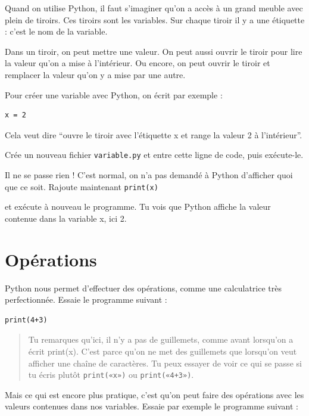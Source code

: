 \documentclass[a4paper,french,11pt]{article}
\begin{document}
Quand on utilise Python, il faut s'imaginer qu'on a accès à un grand
meuble avec plein de tiroirs. Ces tiroirs sont les variables. Sur chaque
tiroir il y a une étiquette : c'est le nom de la variable.

Dans un tiroir, on peut mettre une valeur. On peut aussi ouvrir le
tiroir pour lire la valeur qu'on a mise à l'intérieur. Ou encore, on
peut ouvrir le tiroir et remplacer la valeur qu'on y a mise par une
autre.

Pour créer une variable avec Python, on écrit par exemple :

\begin{verbatim}
x = 2
\end{verbatim}

Cela veut dire ``ouvre le tiroir avec l'étiquette x et range la valeur 2
à l'intérieur''.

Crée un nouveau fichier \texttt{variable.py} et entre cette
ligne de code, puis exécute-le.

Il ne se passe rien ! C'est normal, on n'a pas demandé à Python
d'afficher quoi que ce soit. Rajoute maintenant
\texttt{print(x)}

et exécute à nouveau le programme. Tu vois que Python affiche la valeur
contenue dans la variable x, ici 2.

\hypertarget{opuxe9rations}{%
\section{Opérations}\label{opuxe9rations}}

Python nous permet d'effectuer des opérations, comme une calculatrice
très perfectionnée. Essaie le programme suivant :

\begin{verbatim}
print(4+3)
\end{verbatim}

\begin{quote}
Tu remarques qu'ici, il n'y a pas de guillemets, comme avant lorsqu'on a
écrit print(x). C'est parce qu'on ne met des guillemets que lorsqu'on
veut afficher une chaîne de caractères. Tu peux essayer de voir ce qui
se passe si tu écris plutôt \texttt{print(«x»)} ou
\texttt{print(«4+3»)}.
\end{quote}

Mais ce qui est encore plus pratique, c'est qu'on peut faire des
opérations avec les valeurs contenues dans nos variables. Essaie par
exemple le programme suivant :
\end{document}
